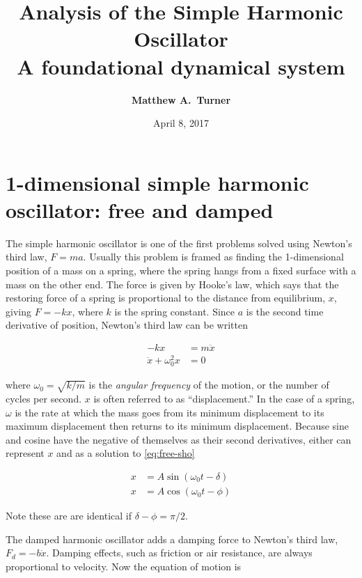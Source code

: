 \documentclass[10pt,letterpaper]{article}
\title{Analysis of the Simple Harmonic Oscillator \\ 
    {\small A foundational dynamical system}
}
\author{{\bf Matthew A.~Turner}}
\date{April 8, 2017}
\begin{document}
\maketitle

\section{1-dimensional simple harmonic oscillator: free and damped}
\label{sec:1d}

The simple harmonic oscillator is one of the first problems solved using
Newton's third law, $F=ma$. Usually this problem is framed as finding the
1-dimensional position of a mass on a spring, where the spring hangs from
a fixed surface with a mass on the other end.
The force is given by Hooke's law, which says that the restoring force 
of a spring is proportional to the distance from equilibrium, $x$, giving
$F = -k x$, where $k$ is the spring constant. Since $a$ is the second 
time derivative of position, Newton's third law can be written

\begin{align*}
    -k x &= m \ddot{x} \\
    \ddot{x} + \omega_0^2 x &= 0
    \label{eq:free-sho}
\end{align*}

\noindent
where $\omega_0 = \sqrt{k/m}$ is the \textit{angular frequency} of the motion,
or the number of cycles per second. $x$ is often referred to as ``displacement.''
In the case of a spring, $\omega$ is the 
rate at which the mass goes from its minimum displacement to its maximum 
displacement then returns to its minimum displacement. Because
sine and cosine have the negative of themselves as their second derivatives,
either can represent $x$ and as a solution to \ref{eq:free-sho}

\begin{subequations}
    \begin{align}
        x & = A \sin(\omega_0 t - \delta) \\
        x & = A \cos(\omega_0 t - \phi)
    \end{align}
\end{subequations}

\noindent
Note these are are identical if $\delta - \phi = \pi / 2$. 

The damped harmonic oscillator adds a damping force to Newton's third law,
$F_d = -b \dot{x}$. Damping effects, such as friction or air resistance,
are always proportional to velocity. Now the equation of motion is
\end{document}
